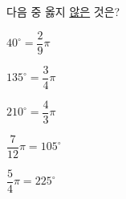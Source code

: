 다음 중 옳지 \underline{않은} 것은?
\begin{choices32}{\rule[-3ex]{0pt}{8ex}$40^\circ=\dfrac{2}{9}\pi$}{\rule[-3ex]{0pt}{8ex}$135^\circ=\dfrac{3}{4}\pi$}{\rule[-3ex]{0pt}{8ex}$210^\circ=\dfrac{4}{3}\pi$}{\rule[-3ex]{0pt}{8ex}$\dfrac{7}{12}\pi=105^\circ$}{\rule[-3ex]{0pt}{8ex}$\dfrac{5}{4}\pi=225^\circ$}\end{choices32}

